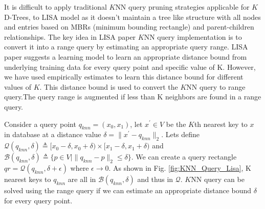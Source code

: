 It is difficult to apply traditional $K$NN query pruning strategies applicable for $K$D-Trees, to LISA model as it doesn't maintain a tree like structure with all nodes and
entries based on MBRs (minimum bounding rectangle) and parent-children relationships. %
The key idea in LISA paper $K$NN query implementation is to convert it into a range query by estimating an appropriate query range. LISA paper suggests a learning model to learn an appropriate distance bound from underlying training data for every query point and specific value of K. However, we have used empirically estimates to learn this distance bound for different values of $K$. This distance bound is used to convert the $K$NN query to range query.The query range is augmented if less than K neighbors are found in a range query. 

Consider a query point $q_{knn}=(x_{0},x_{1})$, let $x^{'} \in V$ be the $K$th nearest key to $x$ in database at a distance value $\delta = \| x^{'}-q_{knn}\|_{2} $. Lets define $ \mathcal{Q}(q_{knn},\delta) \triangleq [x_{0}-\delta, x_{0}+\delta) \times[x_{1}-\delta, x_{1}+\delta)$ and $\mathcal{B}(q_{knn}, \delta)  \triangleq \{p \in V \mid \| q_{knn}-p\|_{2} \leq \delta \} $. We can create a query rectangle $qr =  \mathcal{Q}(q_{knn}, \delta + \epsilon)$ where $\epsilon \rightarrow 0$. As shown in Fig. \ref{fig:KNN_Query_Lisa}, K nearest keys to $q_{knn}$ are all in $\mathcal{B}(q_{knn}, \delta)$ and thus in $\mathcal{Q}$. $K$NN query can be solved using the range query if we can estimate an appropriate distance bound $\delta$ for every query point.

